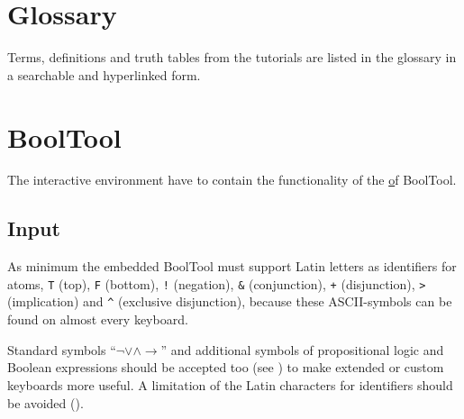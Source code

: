 %
%


\section{Glossary}

Terms, definitions and truth tables from the tutorials are listed in the glossary in a searchable and hyperlinked form.

\section{BoolTool}

The interactive environment have to contain the functionality of the \href{web fronted} of BoolTool.

\subsection{Input}

As minimum the embedded BoolTool must support Latin letters as identifiers for atoms, 
\verb#T# (top), 
\verb#F# (bottom),
\verb#!# (negation), 
\verb#&# (conjunction),
\verb#+# (disjunction),
\verb#># (implication) and 
\verb#^# (exclusive disjunction), because these ASCII-symbols can be found on almost every keyboard.

Standard symbols “$ \neg \vee \wedge \rightarrow $” 
and additional symbols of propositional logic and Boolean expressions
should be accepted too (see ) 
to make extended or custom keyboards more useful.
A limitation of the Latin characters for identifiers should be avoided ().

